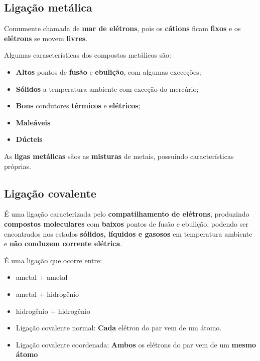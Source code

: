 \documentclass{article}
\begin{document}
\subsection{Ligação metálica}
Comumente chamada de \textbf{mar de elétrons}, pois os \textbf{cátions} ficam \textbf{fixos} e os \textbf{elétrons} se movem \textbf{livres}.

Algumas carascterísticas dos compostos metálicos são:
\begin{itemize}
    \item \textbf{Altos} pontos de \textbf{fusão} e \textbf{ebulição}, com algumas execeções;
    \item \textbf{Sólidos} a temperatura ambiente com exceção do mercúrio;
    \item \textbf{Bons} condutores \textbf{térmicos} e \textbf{elétricos};
    \item \textbf{Maleáveis}
    \item \textbf{Dúcteis}
\end{itemize}

As \textbf{ligas metálicas} sãos as \textbf{misturas} de metais, possuindo características próprias.

\subsection{Ligação covalente}
É uma ligação caracterizada pelo \textbf{compatilhamento de elétrons},
produzindo \textbf{compostos moleculares} com \textbf{baixos} pontos de fusão e ebulição,
podendo ser encontrados nos estados \textbf{sólidos,
líquidos e gasosos} em temperatura ambiente e \textbf{não conduzem corrente elétrica}.

É uma ligação que ocorre entre:
\begin{itemize}
    \item ametal + ametal
    \item ametal + hidrogênio
    \item hidrogênio + hidrogênio
\end{itemize}

\begin{itemize}
    \item Ligação covalente normal: \textbf{Cada} elétron do par vem de um átomo.
    \item Ligação covalente coordenada: \textbf{Ambos} os elétrons do par vem de um \textbf{mesmo átomo}
\end{itemize}
\end{document}
